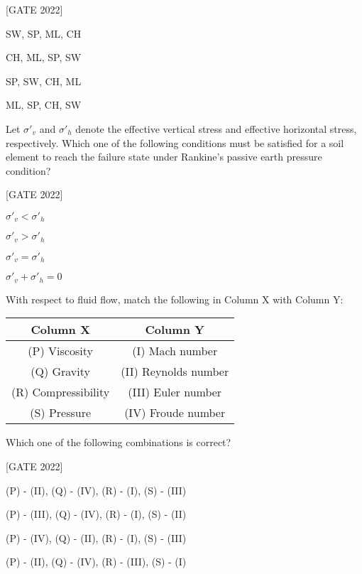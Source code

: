 \hfill{[GATE 2022]}\begin{enumerate}
    \begin{multicols}{2}
        \item SW, SP, ML, CH
        \item CH, ML, SP, SW
        \item SP, SW, CH, ML
        \item ML, SP, CH, SW
    \end{multicols}
\end{enumerate}

\vspace{1em}

\item Let $\sigma'_v$ and $\sigma'_h$ denote the effective vertical stress and effective horizontal stress, respectively. Which one of the following conditions must be satisfied for a soil element to reach the failure state under Rankine's passive earth pressure condition?

\hfill{[GATE 2022]}\begin{enumerate}
    \begin{multicols}{2}
        \item $\sigma'_v < \sigma'_h$
        \item $\sigma'_v > \sigma'_h$
        \item $\sigma'_v = \sigma'_h$
        \item $\sigma'_v + \sigma'_h = 0$
    \end{multicols}
\end{enumerate}

\item With respect to fluid flow, match the following in Column X with Column Y:

\begin{center}
\begin{tabular}{|c|c|}
\hline
\textbf{Column X} & \textbf{Column Y} \\
\hline
(P) Viscosity & (I) Mach number \\
(Q) Gravity & (II) Reynolds number \\
(R) Compressibility & (III) Euler number \\
(S) Pressure & (IV) Froude number \\
\hline
\end{tabular}
\end{center}

Which one of the following combinations is correct?

\hfill{[GATE 2022]}\begin{enumerate}
    \begin{multicols}{2}
        \item (P) - (II), (Q) - (IV), (R) - (I), (S) - (III)
        \item (P) - (III), (Q) - (IV), (R) - (I), (S) - (II)
        \item (P) - (IV), (Q) - (II), (R) - (I), (S) - (III)
        \item (P) - (II), (Q) - (IV), (R) - (III), (S) - (I)
    \end{multicols}
\end{enumerate}


